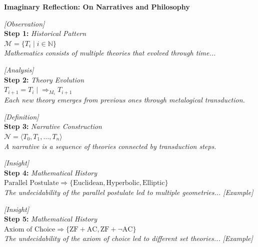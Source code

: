 \documentclass[runningheads]{llncs}
\begin{document}
\begin{center}
\textbf{Imaginary Reflection: On Narratives and Philosophy}
\end{center}

\vspace{0.5em}

\noindent\textit{[Observation]}\\
\noindent\textbf{Step 1:} \hfill \textit{Historical Pattern}\\
\noindent$\mathcal{M} = \{T_i \mid i \in \mathbb{N}\}$\\
\textit{Mathematics consists of multiple theories that evolved through time...}

\vspace{0.8em}

\noindent\textit{[Analysis]}\\
\noindent\textbf{Step 2:} \hfill \textit{Theory Evolution}\\
\noindent$T_{i+1} = T_i \mid\!\Rightarrow_{M_i} T_{i+1}$\\
\textit{Each new theory emerges from previous ones through metalogical transduction.}

\vspace{0.8em}

\noindent\textit{[Definition]}\\
\noindent\textbf{Step 3:} \hfill \textit{Narrative Construction}\\
\noindent$\mathcal{N} = \langle T_0, T_1, \ldots, T_n \rangle$\\
\textit{A narrative is a sequence of theories connected by transduction steps.}

\vspace{0.8em}

\noindent\textit{[Insight]}\\
\noindent\textbf{Step 4:} \hfill \textit{Mathematical History}\\
\noindent$\text{Parallel Postulate} \Rightarrow \{\text{Euclidean}, \text{Hyperbolic}, \text{Elliptic}\}$\\
\textit{The undecidability of the parallel postulate led to multiple geometries...}
\noindent\textit{[Example]}

\vspace{0.8em}

\noindent\textit{[Insight]}\\
\noindent\textbf{Step 5:} \hfill \textit{Mathematical History}\\
\noindent$\text{Axiom of Choice} \Rightarrow \{\text{ZF}+\text{AC}, \text{ZF}+\neg\text{AC}\}$\\
\textit{The undecidability of the axiom of choice led to different set theories...}
\noindent\textit{[Example]}
\end{document}
